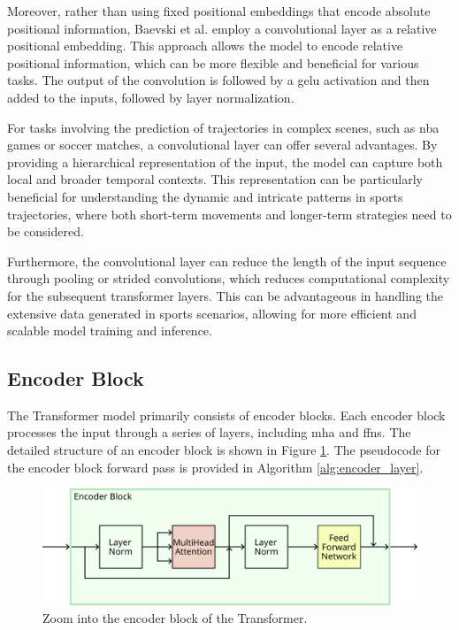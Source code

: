 Moreover, rather than using fixed positional embeddings that encode absolute positional information, Baevski et al. employ a convolutional layer as a relative positional embedding. This approach allows the model to encode relative positional information, which can be more flexible and beneficial for various tasks. The output of the convolution is followed by a \gls{gelu} activation and then added to the inputs, followed by layer normalization.

For tasks involving the prediction of trajectories in complex scenes, such as \gls{nba} games or soccer matches, a convolutional layer can offer several advantages. By providing a hierarchical representation of the input, the model can capture both local and broader temporal contexts. This representation can be particularly beneficial for understanding the dynamic and intricate patterns in sports trajectories, where both short-term movements and longer-term strategies need to be considered.

Furthermore, the convolutional layer can reduce the length of the input sequence through pooling or strided convolutions, which reduces computational complexity for the subsequent transformer layers. This can be advantageous in handling the extensive data generated in sports scenarios, allowing for more efficient and scalable model training and inference.



\subsection{Encoder Block}
\label{sec:enc_block}
The Transformer model primarily consists of encoder blocks. Each encoder block processes the input through a series of layers, including \gls{mha} and \glspl{ffn}. The detailed structure of an encoder block is shown in Figure \ref{fig:encoder_block}. The pseudocode for the encoder block forward pass is provided in Algorithm \ref{alg:encoder_layer}.

\begin{figure}[t]
    \centering
    \begin{minipage}{\textwidth}
        \includegraphics[width=\textwidth]{contents/Basics/encoder_block.png}
        \caption{Zoom into the encoder block of the Transformer.}
        \label{fig:encoder_block}
    \end{minipage}
    \vspace{-1em} %
\end{figure}

